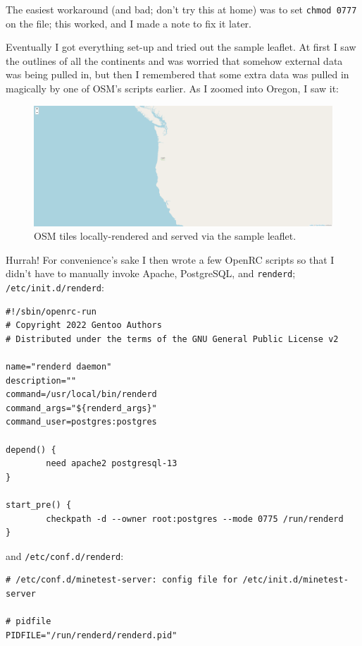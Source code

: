 \documentclass{article}
\begin{document}
The easiest workaround (and bad; don't try this at home) was to set \texttt{chmod 0777} on the file; this worked, and I made a note to fix it later.

Eventually I got everything set-up and tried out the sample leaflet.  At first I saw the outlines of all the continents and was worried that somehow external data was being pulled in, but then I remembered that some extra data was pulled in magically by one of OSM's scripts earlier.  As I zoomed into Oregon, I saw it:

\begin{figure}
\includegraphics{files/blog/2022_04_17_generating_openstreetmap_tiles_for_offline_slippy_maps/2022_04_17_working.png}
\caption{OSM tiles locally-rendered and served via the sample leaflet.}
\end{figure}

Hurrah!  For convenience's sake I then wrote a few OpenRC scripts so that I didn't have to manually invoke Apache, PostgreSQL, and \texttt{renderd}; \texttt{/etc/init.d/renderd}:

\begin{verbatim}
#!/sbin/openrc-run
# Copyright 2022 Gentoo Authors
# Distributed under the terms of the GNU General Public License v2

name="renderd daemon"
description=""
command=/usr/local/bin/renderd
command_args="${renderd_args}"
command_user=postgres:postgres

depend() {
        need apache2 postgresql-13
}

start_pre() {
        checkpath -d --owner root:postgres --mode 0775 /run/renderd
}
\end{verbatim}

and \texttt{/etc/conf.d/renderd}:

\begin{verbatim}
# /etc/conf.d/minetest-server: config file for /etc/init.d/minetest-server

# pidfile
PIDFILE="/run/renderd/renderd.pid"
\end{verbatim}
\end{document}
